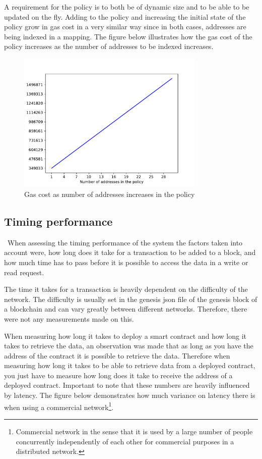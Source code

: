 \documentclass[12pt]{article}
\begin{document}
A requirement for the policy is to both be of dynamic size and to be able to be updated on the fly. Adding to the policy and increasing the initial state of the policy grow in gas cost in a very similar way since in both cases, addresses are being indexed in a mapping. The figure below illustrates how the gas cost of the policy increases as the number of addresses to be indexed increases.

\begin{figure}[H]
    \centering
    \includegraphics[width=0.8\textwidth]{PolicyGasData.pdf}
    \caption{Gas cost as number of addresses increases in the policy}
    \label{fig:contractsGasprices}
\end{figure}

\subsection{Timing performance}\
When assessing the timing performance of the system the factors taken into account were, how long does it take for a transaction to be added to a block, and how much time has to pass before it is possible to access the data in a write or read request.

The time it takes for a transaction is heavily dependent on the difficulty of the network. The difficulty is usually set in the genesis json file of the genesis block of a blockchain and can vary greatly between different networks. Therefore, there were not any measurements made on this. 

When measuring how long it takes to deploy a smart contract and how long it takes to retrieve the data, an observation was made that as long as you have the address of the contract it is possible to retrieve the data. Therefore when measuring how long it takes to be able to retrieve data from a deployed contract, you just have to measure how long does it take to receive the address of a deployed contract. Important to note that these numbers are heavily influenced by latency. The figure below demonstrates how much variance on latency there is when using a commercial network\footnote{Commercial network in the sense that it is used by a large number of people concurrently independently of each other for commercial purposes in a distributed network.}.
\end{document}
